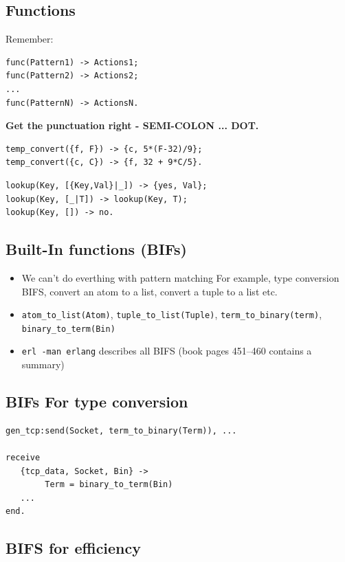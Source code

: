 \documentclass[12pt]{article}
\begin{document}
\subsection{Functions}

Remember:

\begin{verbatim}
func(Pattern1) -> Actions1;
func(Pattern2) -> Actions2;
...
func(PatternN) -> ActionsN.
\end{verbatim}

{\bf Get the punctuation right - SEMI-COLON ... DOT.}

\begin{verbatim}
temp_convert({f, F}) -> {c, 5*(F-32)/9};
temp_convert({c, C}) -> {f, 32 + 9*C/5}.
\end{verbatim}

\begin{verbatim}
lookup(Key, [{Key,Val}|_]) -> {yes, Val};
lookup(Key, [_|T]) -> lookup(Key, T);
lookup(Key, []) -> no.
\end{verbatim}

\subsection{Built-In functions (BIFs)}

\begin{itemize}
\item We can't do everthing with pattern matching For example, type
  conversion BIFS, convert an atom to a list, convert a tuple to a
  list etc.  
\item \verb+atom_to_list(Atom)+, \verb+tuple_to_list(Tuple)+,
  \verb+term_to_binary(term)+, \verb+binary_to_term(Bin)+
\item \verb+erl -man erlang+ describes all BIFS
(book pages 451--460 contains a summary)
\end{itemize}

\subsection{BIFs For type conversion}

\begin{verbatim}
gen_tcp:send(Socket, term_to_binary(Term)), ...

receive
   {tcp_data, Socket, Bin} ->
        Term = binary_to_term(Bin)
   ...
end.
\end{verbatim}

\subsection{BIFS for efficiency}
\end{document}

